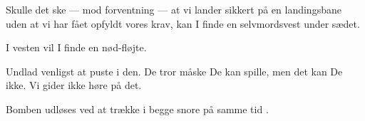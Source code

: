 \documentclass[a4paper,11pt]{article}
\begin{document}
\begin{sketch}


 Skulle det ske --- mod forventning --- at vi lander sikkert på en landingsbane
uden at vi har fået opfyldt vores krav, kan I finde en selvmordsvest under sædet.


 I vesten vil I finde en nød-fløjte.


 Undlad venligst at puste i den.  De tror måske De kan spille, men det kan De ikke.
Vi gider ikke høre på det.

 Bomben udløses ved at trække i begge snore  på samme tid .



\end{sketch}
\end{document}
